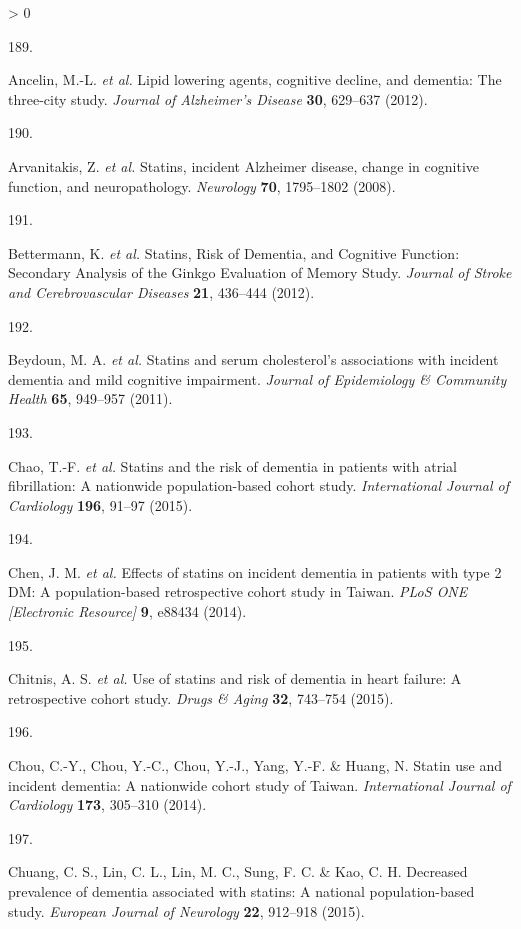 \documentclass[a4paper, twoside]{templates/ociamthesis}
\newlength{\cslhangindent}
\newlength{\csllabelwidth}
\newenvironment{CSLReferences}[3] %
 {%
  \setlength{\parindent}{0pt}
  \ifodd #1 \everypar{\setlength{\hangindent}{\cslhangindent}}\ignorespaces\fi
  \ifnum #2 > 0
  \setlength{\parskip}{#2\baselineskip}
  \fi
 }%
 {}
\newcommand{\CSLLeftMargin}[1]{\parbox[t]{\maxof{\widthof{#1}}{\csllabelwidth}}{#1}}
\newcommand{\CSLRightInline}[1]{\parbox[t]{\linewidth - \csllabelwidth}{#1}}
\begin{document}
\begin{CSLReferences}{0}{0}
\leavevmode\hypertarget{ref-ancelin2012}{}%
\CSLLeftMargin{189. }
\CSLRightInline{Ancelin, M.-L. \emph{et al.} Lipid lowering agents, cognitive decline, and dementia: The three-city study. \emph{Journal of Alzheimer's Disease} \textbf{30}, 629--637 (2012).}

\leavevmode\hypertarget{ref-arvanitakis2008}{}%
\CSLLeftMargin{190. }
\CSLRightInline{Arvanitakis, Z. \emph{et al.} Statins, incident {Alzheimer} disease, change in cognitive function, and neuropathology. \emph{Neurology} \textbf{70}, 1795--1802 (2008).}

\leavevmode\hypertarget{ref-bettermann2012}{}%
\CSLLeftMargin{191. }
\CSLRightInline{Bettermann, K. \emph{et al.} Statins, {Risk} of {Dementia}, and {Cognitive Function}: Secondary {Analysis} of the {Ginkgo Evaluation} of {Memory Study}. \emph{Journal of Stroke and Cerebrovascular Diseases} \textbf{21}, 436--444 (2012).}

\leavevmode\hypertarget{ref-beydoun2011}{}%
\CSLLeftMargin{192. }
\CSLRightInline{Beydoun, M. A. \emph{et al.} Statins and serum cholesterol's associations with incident dementia and mild cognitive impairment. \emph{Journal of Epidemiology \& Community Health} \textbf{65}, 949--957 (2011).}

\leavevmode\hypertarget{ref-chao2015}{}%
\CSLLeftMargin{193. }
\CSLRightInline{Chao, T.-F. \emph{et al.} Statins and the risk of dementia in patients with atrial fibrillation: A nationwide population-based cohort study. \emph{International Journal of Cardiology} \textbf{196}, 91--97 (2015).}

\leavevmode\hypertarget{ref-chen2014}{}%
\CSLLeftMargin{194. }
\CSLRightInline{Chen, J. M. \emph{et al.} Effects of statins on incident dementia in patients with type 2 {DM}: A population-based retrospective cohort study in {Taiwan}. \emph{PLoS ONE {[}Electronic Resource{]}} \textbf{9}, e88434 (2014).}

\leavevmode\hypertarget{ref-chitnis2015}{}%
\CSLLeftMargin{195. }
\CSLRightInline{Chitnis, A. S. \emph{et al.} Use of statins and risk of dementia in heart failure: A retrospective cohort study. \emph{Drugs \& Aging} \textbf{32}, 743--754 (2015).}

\leavevmode\hypertarget{ref-chou2014}{}%
\CSLLeftMargin{196. }
\CSLRightInline{Chou, C.-Y., Chou, Y.-C., Chou, Y.-J., Yang, Y.-F. \& Huang, N. Statin use and incident dementia: A nationwide cohort study of {Taiwan}. \emph{International Journal of Cardiology} \textbf{173}, 305--310 (2014).}

\leavevmode\hypertarget{ref-chuang2015}{}%
\CSLLeftMargin{197. }
\CSLRightInline{Chuang, C. S., Lin, C. L., Lin, M. C., Sung, F. C. \& Kao, C. H. Decreased prevalence of dementia associated with statins: A national population-based study. \emph{European Journal of Neurology} \textbf{22}, 912--918 (2015).}


\end{CSLReferences}
\end{document}
